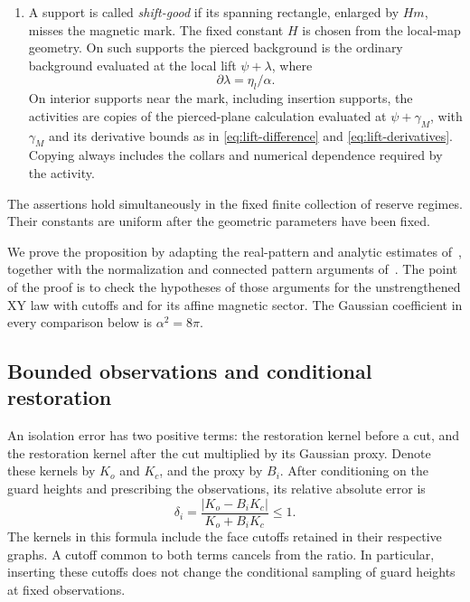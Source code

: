 \begin{proposition}
\begin{enumerate}
\item A support is called \emph{shift-good} if its spanning rectangle,
enlarged by $Hm$, misses the magnetic mark. The fixed constant $H$
is chosen from the local-map geometry. On such supports the pierced
background is the ordinary background evaluated at the local lift
$\psi+\lambda$, where
\[
                    \partial\lambda=\eta_l/\alpha.
\]
On interior supports near the mark, including insertion supports, the
activities are copies of the pierced-plane calculation evaluated at
$\psi+\gamma_M$, with $\gamma_M$ and its derivative bounds as in
\eqref{eq:lift-difference} and \eqref{eq:lift-derivatives}. Copying always
includes the collars and numerical dependence required by the activity.
\end{enumerate}
The assertions hold simultaneously in the fixed finite collection of
reserve regimes. Their constants are uniform after the geometric
parameters have been fixed.
\end{proposition}

We prove the proposition by adapting the real-pattern and analytic
estimates of~\cite[Section 5, Lemma
5.4]{X}, together with the normalization and connected
pattern arguments of~\cite[Section 9]{B}. The point of
the proof is to check the hypotheses of those arguments for the
unstrengthened XY law with cutoffs and for its affine magnetic sector.
The Gaussian coefficient in every comparison below is $\alpha^2=8\pi$.

\subsection{Bounded observations and conditional restoration}

An isolation error has two positive terms: the restoration kernel
before a cut, and the restoration kernel after the cut multiplied by
its Gaussian proxy. Denote these kernels by $K_o$ and $K_c$, and the
proxy by $B_i$. After conditioning on the guard heights and prescribing
the observations, its relative absolute error is
\begin{equation}\label{eq:entry-relative-error}
                  \delta_i=
            \frac{|K_o-B_iK_c|}{K_o+B_iK_c}\le1.
\end{equation}
The kernels in this formula include the face cutoffs retained in their
respective graphs. A cutoff common to both terms cancels from the
ratio. In particular, inserting these cutoffs does not change the
conditional sampling of guard heights at fixed observations.

